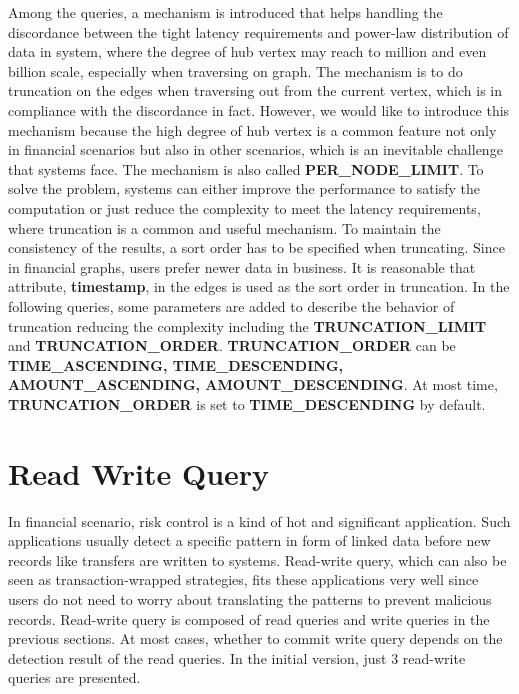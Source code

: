 Among the queries, a mechanism is introduced that helps handling the discordance
between the tight latency requirements
and power-law distribution of data in system, where the degree of hub vertex may
reach to million and even billion scale, especially when traversing on graph.
The mechanism is to do truncation on the edges when traversing out from the
current vertex, which is in compliance with the discordance in fact. However, we
would like to introduce this mechanism because the high degree of hub vertex is
a common feature not only in financial scenarios but also in other scenarios,
which is an inevitable challenge that systems face. The mechanism is also called
\textbf{PER\_NODE\_LIMIT}. To solve the problem, systems can either
improve the performance to satisfy the computation or just reduce the
complexity to meet the latency requirements, where truncation is a common and
useful mechanism. To maintain the consistency of the results, a sort order has
to be specified when truncating. Since in financial graphs, users prefer newer
data in business. It is reasonable that attribute, \textbf{timestamp}, in the
edges is used as the sort order in truncation. In the following queries, some
parameters are added to describe the behavior of truncation reducing the
complexity including the \textbf{TRUNCATION\_LIMIT} and \textbf{TRUNCATION\_ORDER}.
\textbf{TRUNCATION\_ORDER} can be \textbf{TIME\_ASCENDING, TIME\_DESCENDING,
AMOUNT\_ASCENDING, AMOUNT\_DESCENDING}. At most time, \textbf{TRUNCATION\_ORDER}
is set to \textbf{TIME\_DESCENDING} by default.


\section{Read Write Query}

In financial scenario, risk control is a kind of hot and significant application.
Such applications usually detect a specific pattern in form of linked data before
new records like transfers are written to systems. Read-write query, which can also
be seen as transaction-wrapped strategies, fits these applications very well since
users do not need to worry about translating the patterns to prevent malicious records.
Read-write query is composed of read queries and write queries in the previous sections.
At most cases, whether to commit write query depends on the detection result of the
read queries. In the initial version, just 3 read-write queries are presented.